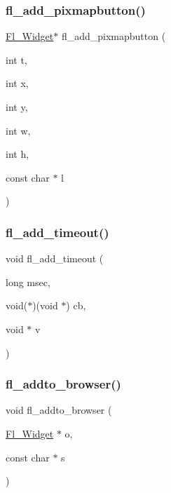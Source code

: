 \subsubsection{\texorpdfstring{fl\+\_\+add\+\_\+pixmapbutton()}{fl\_add\_pixmapbutton()}}
{\footnotesize\ttfamily \hyperlink{class_fl___widget}{Fl\+\_\+\+Widget}$\ast$ fl\+\_\+add\+\_\+pixmapbutton (\begin{DoxyParamCaption}\item[{int}]{t,  }\item[{int}]{x,  }\item[{int}]{y,  }\item[{int}]{w,  }\item[{int}]{h,  }\item[{const char $\ast$}]{l }\end{DoxyParamCaption})\hspace{0.3cm}{\ttfamily [inline]}}

\mbox{\label{forms_8_h_ad4dabcf09473692a8bba97fd731cfb0f}} 
\subsubsection{\texorpdfstring{fl\+\_\+add\+\_\+timeout()}{fl\_add\_timeout()}}
{\footnotesize\ttfamily void fl\+\_\+add\+\_\+timeout (\begin{DoxyParamCaption}\item[{long}]{msec,  }\item[{void($\ast$)(void $\ast$)}]{cb,  }\item[{void $\ast$}]{v }\end{DoxyParamCaption})\hspace{0.3cm}{\ttfamily [inline]}}

\mbox{\label{forms_8_h_a18f45e842f0eef0f8a762d18fbee5b7e}} 
\subsubsection{\texorpdfstring{fl\+\_\+addto\+\_\+browser()}{fl\_addto\_browser()}}
{\footnotesize\ttfamily void fl\+\_\+addto\+\_\+browser (\begin{DoxyParamCaption}\item[{\hyperlink{class_fl___widget}{Fl\+\_\+\+Widget} $\ast$}]{o,  }\item[{const char $\ast$}]{s }\end{DoxyParamCaption})\hspace{0.3cm}{\ttfamily [inline]}}

